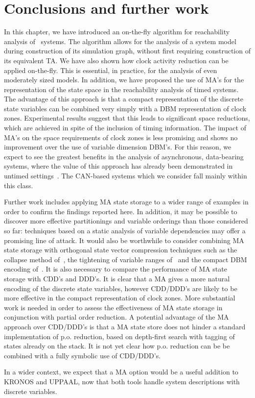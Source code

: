 \section{Conclusions and further work \label{sec:sgconc}}
In this chapter, we have introduced an on-the-fly algorithm for 
reachability analysis of \bcandle\ systems. The algorithm allows for the 
analysis of a system model during construction of its simulation graph,
without first requiring construction of its equivalent TA. We have also
shown how clock activity reduction can be applied on-the-fly. This is 
essential, in practice, for the analysis of even moderately sized models.
In addition, we have proposed the use of MA's for the
representation of the state space in the reachability analysis of
timed systems. The advantage of this approach is that a compact
representation of the discrete state variables can be combined very
simply with a DBM representation of clock zones. Experimental results
suggest that this leads to significant space reductions, which are
achieved in spite of the inclusion of timing information. The impact
of MA's on the space requirements of clock zones is less promising and
shows no improvement over the use of variable dimension DBM's. For
this reason, we expect to see the greatest benefits in the analysis of
asynchronous, data-bearing systems, where the value of this approach
has already been demonstrated in untimed
settings~\cite{ggz:95,gre:96}. The CAN-based systems which we consider
fall mainly within this class.

Further work includes applying MA state storage to a wider range of
examples in order to confirm the findings reported here. In addition,
it may be possible to discover more effective partitionings and
variable orderings than those considered so far: techniques based on a
static analysis of variable dependencies may offer a promising line of
attack.  It would also be worthwhile to consider combining MA state
storage with orthogonal state vector compression techniques such as
the collapse method of~\cite{vis:96}, the tightening of variable
ranges of~\cite{gd:99} and the compact DBM encoding
of~\cite{llp:97}. It is also necessary to compare the performance of
MA state storage with CDD's and DDD's. It is clear that a MA gives a
more natural encoding of the discrete state variables, however
CDD/DDD's are likely to be more effective in the compact
representation of clock zones. More substantial work is needed in
order to assess the effectiveness of MA state storage in conjunction
with partial order reduction. A potential advantage of the MA approach
over CDD/DDD's is that a MA state store does not hinder a standard
implementation of p.o. reduction, based on depth-first search with
tagging of states already on the stack. It is not yet clear how
p.o. reduction can be be combined with a fully symbolic use of
CDD/DDD's. 

In a wider context, we expect that a MA option would be a useful
addition to KRONOS and UPPAAL, now that both tools handle system
descriptions with discrete variables.





